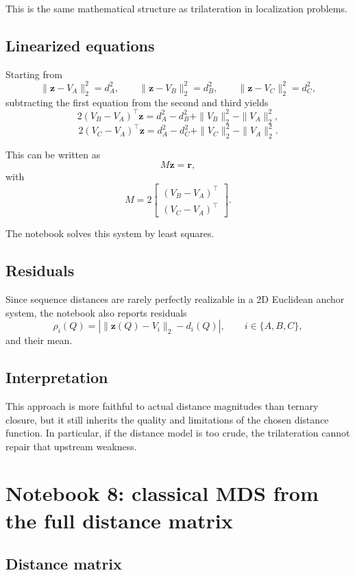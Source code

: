 \documentclass[11pt,a4paper]{article}
\begin{document}
This is the same mathematical structure as trilateration in localization problems.

\subsection{Linearized equations}

Starting from
\[
\|\bm{z}-V_A\|_2^2=d_A^2,\qquad
\|\bm{z}-V_B\|_2^2=d_B^2,\qquad
\|\bm{z}-V_C\|_2^2=d_C^2,
\]
subtracting the first equation from the second and third yields
\[
2(V_B-V_A)^\top \bm{z}
=d_A^2-d_B^2+\|V_B\|_2^2-\|V_A\|_2^2,
\]
\[
2(V_C-V_A)^\top \bm{z}
=d_A^2-d_C^2+\|V_C\|_2^2-\|V_A\|_2^2.
\]

This can be written as
\[
M\bm{z}=\bm{r},
\]
with
\[
M=
2\begin{bmatrix}
(V_B-V_A)^\top \\
(V_C-V_A)^\top
\end{bmatrix}.
\]

The notebook solves this system by least squares.

\subsection{Residuals}

Since sequence distances are rarely perfectly realizable in a 2D Euclidean anchor system, the notebook also reports residuals
\[
\rho_i(Q)=\left|\|\bm{z}(Q)-V_i\|_2-d_i(Q)\right|,
\qquad i\in\{A,B,C\},
\]
and their mean.

\subsection{Interpretation}

This approach is more faithful to actual distance magnitudes than ternary closure, but it still inherits the quality and limitations of the chosen distance function. In particular, if the distance model is too crude, the trilateration cannot repair that upstream weakness.

\section{Notebook 8: classical MDS from the full distance matrix}

\subsection{Distance matrix}
\end{document}
